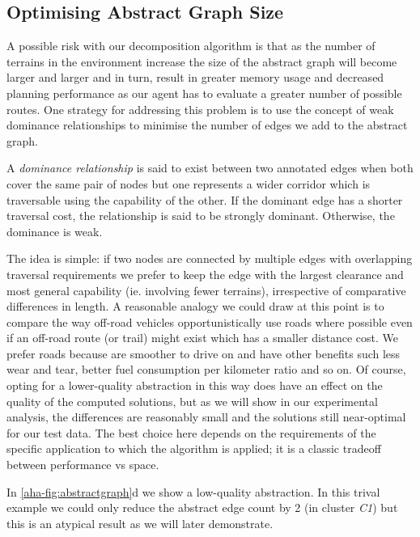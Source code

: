 {

\subsection{Optimising Abstract Graph Size}
A possible risk with our decomposition algorithm is that as the number of terrains in the environment increase the size of the abstract graph will become larger and larger and in turn, result in greater memory usage and decreased planning performance as our agent has to evaluate a greater number of possible routes.
One strategy for addressing this problem is to use the concept of weak dominance relationships to minimise the number of edges we add to the abstract graph. 

\begin{definition}
A \emph{dominance relationship} is said to exist between two annotated edges when both cover the same pair of nodes but one represents a wider corridor which is traversable using the capability of the other. If the dominant edge has a shorter traversal cost, the relationship is said to be strongly dominant. Otherwise, the dominance is weak.
\end{definition}

The idea is simple: if two nodes are connected by multiple edges with overlapping traversal requirements we prefer to keep the edge with the largest clearance and most general capability (ie. involving fewer terrains), irrespective of comparative differences in length. A reasonable analogy we could draw at this point is to compare the way off-road vehicles opportunistically use roads where possible even if an off-road route (or trail) might exist which has a smaller distance cost. We prefer roads because are smoother to drive on and have other benefits such less wear and tear, better fuel consumption per kilometer ratio and so on. Of course, opting for a lower-quality abstraction in this way does have an effect on the quality of the computed solutions, but as we will show in our experimental analysis, the differences are reasonably small and the solutions still near-optimal for our test data. The best choice here depends on the requirements of the specific application to which the algorithm is applied; it is a classic tradeoff between performance vs space.

In \ref{aha-fig:abstractgraph}d we show a low-quality abstraction. In this trival example we could only reduce the abstract edge count by 2 (in cluster \emph{C1}) but this is an atypical result as we will later demonstrate.

}
